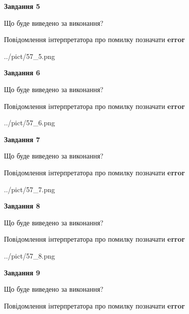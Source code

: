 \documentclass[11pt, ukrainian]{article}
\begin{document}
{\begin {large}
{\begin {center}\textbf{Завдання 5}\end {center}}\par
Що буде виведено за виконання? \par
Повідомлення інтерпретатора про помилку позначати \textbf{error}

\begin{center}
	{../pict/57_5.png}
\end{center}
\newpage

{\begin {center}\textbf{Завдання 6}\end {center}}\par
Що буде виведено за виконання? \par
Повідомлення інтерпретатора про помилку позначати \textbf{error}

\begin{center}
	{../pict/57_6.png}
\end{center}
\newpage

{\begin {center}\textbf{Завдання 7}\end {center}}\par
Що буде виведено за виконання? \par
Повідомлення інтерпретатора про помилку позначати \textbf{error}

\begin{center}
	{../pict/57_7.png}
\end{center}
\newpage

{\begin {center}\textbf{Завдання 8}\end {center}}\par
Що буде виведено за виконання? \par
Повідомлення інтерпретатора про помилку позначати \textbf{error}

\begin{center}
	{../pict/57_8.png}
\end{center}
\newpage

{\begin {center}\textbf{Завдання 9}\end {center}}\par
Що буде виведено за виконання? \par
Повідомлення інтерпретатора про помилку позначати \textbf{error}


\end{large}}
\end{document}

